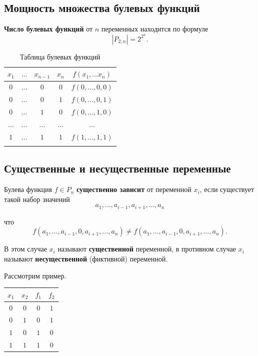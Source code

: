 \documentclass[a5paper, 11pt]{extarticle}
\theoremstyle{definition}
\theoremstyle{definition}
\theoremstyle{definition}
\numberwithin{figure}{section}
\numberwithin{table}{section}
\begin{document}
\subsection{Мощность множества булевых функций}

\textbf{Число булевых функций} от \(n\) переменных находится по формуле
\[
    |P_{2, n}| = 2^{2^n}.
\]

\begin{table}[H]
    \renewcommand*{\arraystretch}{1.5}
    \begin{longtable}{|c|c|c|c|c|}
        \hline
        \(x_1\)    & \(\ldots\) & \(x_{n - 1}\) & \(x_n\)    & \(f(x_1, \ldots x_n)\) \\
        \hline
        \(0\)      & \(\ldots\) & \(0\)         & \(0\)      & \(f(0, \ldots, 0, 0)\) \\
        \hline
        \(0\)      & \(\ldots\) & \(0\)         & \(1\)      & \(f(0, \ldots, 0, 1)\) \\
        \hline
        \(0\)      & \(\ldots\) & \(1\)         & \(0\)      & \(f(0, \ldots, 1, 0)\) \\
        \hline
        \(\ldots\) & \(\ldots\) & \(\ldots\)    & \(\ldots\) & \(\ldots\)             \\
        \hline
        \(1\)      & \(\ldots\) & \(1\)         & \(1\)      & \(f(1, \ldots, 1, 1)\) \\
        \hline
        \caption{Таблица булевых функций}
    \end{longtable}
\end{table}

\subsection{Существенные и несущественные переменные}

Булева функция \(f \in P_n\) \textbf{существенно зависит} от переменной \(x_i\), если существует такой набор значений
\[
    a_1, \ldots, a_{i - 1}, a_{i +1}, \ldots, a_n
\]

что
\[
    f(a_1, \ldots, a_{i - 1}, 0, a_{i +1}, \ldots, a_n) \neq f(a_1, \ldots, a_{i - 1}, 0, a_{i +1}, \ldots, a_n).
\]

В этом случае \(x_i\) называют \textbf{существенной} переменной, в противном случае \(x_i\) называют \textbf{несущественной} (фиктивной) переменной.

Рассмотрим пример.

\begin{table}[H]
    \renewcommand*{\arraystretch}{1.5}
    \begin{longtable}{|c|c|c|c|}
        \hline
        \(x_1\) & \(x_2\) & \(f_1\) & \(f_2\) \\
        \hline
        \(0\)   & \(0\)   & \(0\)   & \(1\)   \\
        \hline
        \(0\)   & \(1\)   & \(0\)   & \(1\)   \\
        \hline
        \(1\)   & \(0\)   & \(1\)   & \(0\)   \\
        \hline
        \(1\)   & \(1\)   & \(1\)   & \(0\)   \\
        \hline
    \end{longtable}
\end{table}
\end{document}
